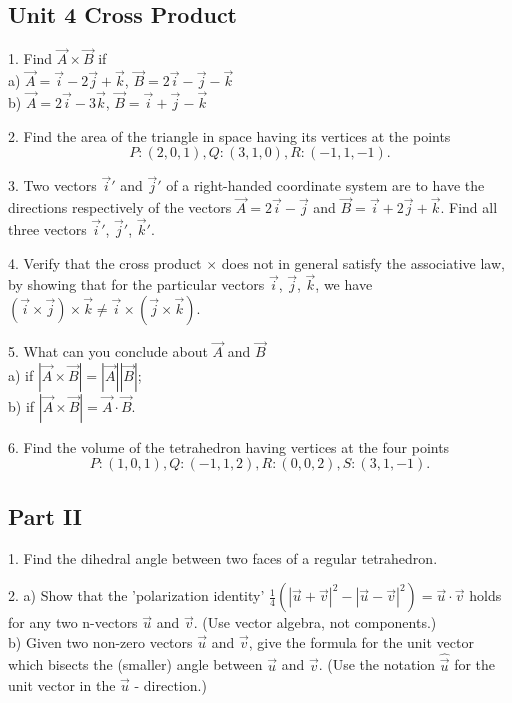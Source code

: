 \documentclass{article}
\begin{document}
\subsection*{Unit 4 Cross Product}

1. Find $\vec{A} \times \vec{B}$ if\\
a) $\vec{A} = \vec{i} - 2 \vec{j} + \vec{k}$, $\vec{B} = 2 \vec{i} - \vec{j} -
\vec{k}$ \\
b) $\vec{A} = 2 \vec{i} - 3 \vec{k}$, $\vec{B} = \vec{i} + \vec{j} - \vec{k}$

2. Find the area of the triangle in space having its vertices at the points
\[ P:(2,0,1), Q:(3,1,0), R:(-1,1,-1).\]

3. Two vectors $\vec{i}'$ and $\vec{j}'$ of a right-handed coordinate system
are to have the directions respectively of the vectors $\vec{A} = 2 \vec{i} -
\vec{j}$ and $\vec{B} = \vec{i} + 2 \vec{j} + \vec{k}$. Find all three vectors
$\vec{i}'$, $\vec{j}'$, $\vec{k}'$.

4. Verify that the cross product $\times$ does not in general satisfy the
associative law, by showing that for the particular vectors $\vec{i}$,
$\vec{j}$, $\vec{k}$, we have $(\vec{i} \times \vec{j}) \times \vec{k} \neq
\vec{i} \times (\vec{j} \times \vec{k})$.

5. What can you conclude about $\vec{A}$ and $\vec{B}$\\
a) if $|\vec{A} \times \vec{B}| = |\vec{A}||\vec{B}|$;\\
b) if $|\vec{A} \times \vec{B}| = \vec{A} \cdot \vec{B}$.

6. Find the volume of the tetrahedron having vertices at the four points
\[ P:(1,0,1), Q:(-1,1,2), R:(0,0,2), S:(3,1,-1).\]

\begin{center}
\section*{Part II}
\end{center}

1. Find the dihedral angle between two faces of a regular tetrahedron.

2. a) Show that the 'polarization identity'
$\frac{1}{4}\left( |\vec{u} + \vec{v}|^{2} - |\vec{u} - \vec{v}|^{2} \right) =
\vec{u} \cdot \vec{v}$ holds for any two n-vectors $\vec{u}$ and $\vec{v}$. (Use
vector algebra, not components.) \\
b) Given two non-zero vectors $\vec{u}$ and $\vec{v}$, give the formula for the
unit vector which bisects the (smaller) angle between $\vec{u}$ and $\vec{v}$.
(Use the notation $\hat{\vec{u}}$ for the unit vector in the $\vec{u}$ -
direction.)
\end{document}
